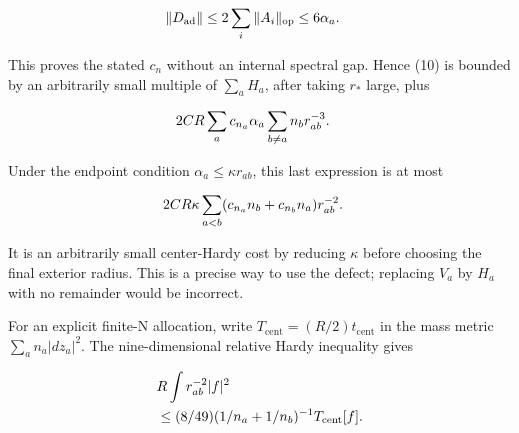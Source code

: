 \begin{gather*}
\begin{aligned}
& \Vert D_{\operatorname{ad}}\Vert \le 2\sum _{i}\Vert A_{i}\Vert _{\mathrm{op}}\le 6\alpha _{a}.
\end{aligned}\notag
\end{gather*}

This proves the stated \(c_{n}\) without an internal spectral gap. Hence
(10) is bounded by an arbitrarily small multiple of \(\sum _{a} H_{a}\),
after taking \(r_{*}\) large, plus

\begin{gather*}
\begin{aligned}
& 2C R \sum _{a} c_{n_{a}}\alpha _{a} \sum _{b\ne a}n_{b} r_{ab}^{-3}.
\end{aligned}\notag
\end{gather*}

Under the endpoint condition \(\alpha _{a}\le  \kappa  r_{ab}\), this
last expression is at most

\begin{gather*}
\begin{aligned}
& 2C R \kappa  \sum _{a<b}(c_{n_{a}}n_{b}+c_{n_{b}}n_{a})r_{ab}^{-2}.
\end{aligned}\notag
\end{gather*}

It is an arbitrarily small center-Hardy cost by reducing \(\kappa\)
before choosing the final exterior radius. This is a precise way to use
the defect; replacing \(V_{a}\) by \(H_{a}\) with no remainder would be
incorrect.

For an explicit finite-N allocation, write
\(T_{\mathrm{cent}}=(R/2)t_{\mathrm{cent}}\) in the mass metric
\(\sum _{a} n_{a}\vert dz_{a}\vert ^{2}\). The nine-dimensional relative
Hardy inequality gives

\begin{gather*}
\begin{aligned}
& R \int  r_{ab}^{-2}\vert f\vert ^{2} \\
& \le (8/49)(1/n_{a}+1/n_{b})^{-1} T_{\mathrm{cent}}[f].
\end{aligned}\notag
\end{gather*}


